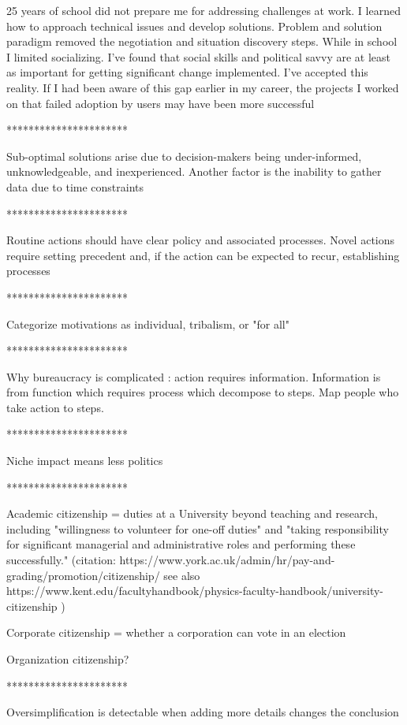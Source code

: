 
25 years of school did not prepare me for addressing challenges at work. I learned how to approach technical issues and develop solutions. Problem and solution paradigm removed the negotiation and situation discovery steps. While in school I limited socializing. I've found that social skills and political savvy are at least as important for getting significant change implemented.  I've accepted this reality. If I had been aware of this gap earlier in my career, the projects I worked on that failed adoption by users may have been more successful 

**********************

Sub-optimal solutions arise due to decision-makers being under-informed, unknowledgeable, and inexperienced. Another factor is the inability to gather data due to time constraints

**********************

Routine actions should have clear policy and associated processes. Novel actions require setting precedent and, if the action can be expected to recur, establishing processes 

**********************

Categorize motivations as individual, tribalism, or "for all"

**********************


Why bureaucracy is complicated : action requires information. Information is from function which requires process which decompose to steps. Map people who take action to steps.

**********************

Niche impact means less politics

**********************

Academic citizenship = duties at a University beyond teaching and research, including "willingness to volunteer for one-off duties" and "taking responsibility for significant managerial and administrative roles and performing these successfully." 
(citation: https://www.york.ac.uk/admin/hr/pay-and-grading/promotion/citizenship/
see also   https://www.kent.edu/facultyhandbook/physics-faculty-handbook/university-citizenship
)

Corporate citizenship = whether a corporation can vote in an election

Organization citizenship?

**********************

Oversimplification is detectable when adding more details changes the conclusion 

